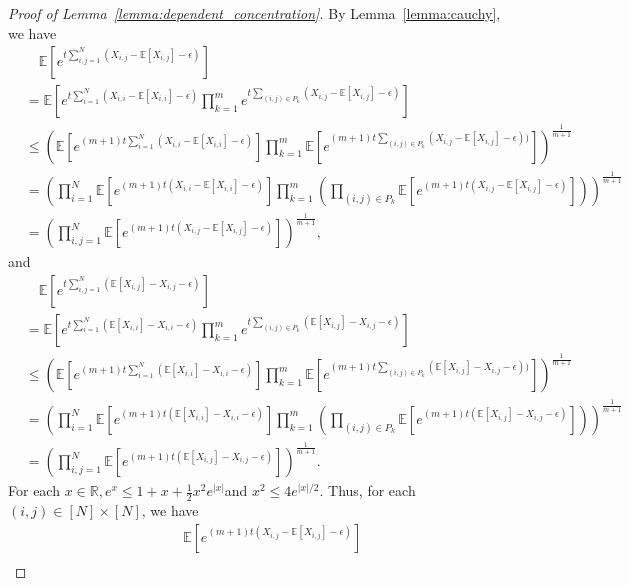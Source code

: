 \begin{proof}[Proof of Lemma~\ref{lemma:dependent_concentration}]
By Lemma~\ref{lemma:cauchy}, we have
\begin{align*}
    &\quad \mathbb{E} \left[ e^{t \sum_{i,j=1}^N (X_{i,j} - \mathbb{E}[X_{i,j}]-\epsilon)} \right] \\
    &= \mathbb{E}\left[e^{t \sum_{i=1}^N (X_{i,i} - \mathbb{E}[X_{i,i}]-\epsilon)}\prod_{k=1}^m e^{t \sum_{(i,j)\in P_k} (X_{i,j} - \mathbb{E}[X_{i,j}]-\epsilon)}  \right]\\
    &\leq \left( \mathbb{E}\left[e^{(m+1)t \sum_{i=1}^N (X_{i,i} - \mathbb{E}[X_{i,i}]-\epsilon)} \right] \prod_{k=1}^m \mathbb{E} \left[e^{(m+1)t \sum_{(i,j)\in P_k} (X_{i,j} - \mathbb{E}[X_{i,j}]-\epsilon))}  \right]\right)^{\frac{1}{m+1}}\\
    &= \left( \prod_{i=1}^N \mathbb{E}\left[e^{(m+1)t(X_{i,i} - \mathbb{E}[X_{i,i}]-\epsilon)} \right] \prod_{k=1}^m \left( \prod_{(i,j) \in P_k} \mathbb{E} \left[e^{(m+1)t (X_{i,j} - \mathbb{E}[X_{i,j}]-\epsilon)}  \right]\right)\right)^{\frac{1}{m+1}}\\
    &= \left(\prod_{i,j=1}^N \mathbb{E}\left[e^{(m+1)t (X_{i,j} - \mathbb{E}[X_{i,j}]-\epsilon)} \right]\right)^{\frac{1}{m+1}},
\end{align*}
and 
\begin{align*}
    &\quad \mathbb{E} \left[ e^{t \sum_{i,j=1}^N ( \mathbb{E}[X_{i,j}]-X_{i,j}-\epsilon)} \right] \\
    &= \mathbb{E}\left[e^{t \sum_{i=1}^N ( \mathbb{E}[X_{i,i}]-X_{i,i}-\epsilon)}\prod_{k=1}^m e^{t \sum_{(i,j)\in P_k} ( \mathbb{E}[X_{i,j}]-X_{i,j}-\epsilon)}  \right]\\
    &\leq \left( \mathbb{E}\left[e^{(m+1)t \sum_{i=1}^N ( \mathbb{E}[X_{i,i}]-X_{i,i}-\epsilon)} \right] \prod_{k=1}^m \mathbb{E} \left[e^{(m+1)t \sum_{(i,j)\in P_k} ( \mathbb{E}[X_{i,j}]-X_{i,j}-\epsilon))}  \right]\right)^{\frac{1}{m+1}}\\
    &= \left( \prod_{i=1}^N \mathbb{E}\left[e^{(m+1)t( \mathbb{E}[X_{i,i}]-X_{i,i}-\epsilon)} \right] \prod_{k=1}^m \left( \prod_{(i,j) \in P_k} \mathbb{E} \left[e^{(m+1)t ( \mathbb{E}[X_{i,j}]-X_{i,j}-\epsilon)}  \right]\right)\right)^{\frac{1}{m+1}}\\
    &= \left(\prod_{i,j=1}^N \mathbb{E}\left[e^{(m+1)t ( \mathbb{E}[X_{i,j}]-X_{i,j}-\epsilon)} \right]\right)^{\frac{1}{m+1}}.
\end{align*}
For each $x \in \mathbb{R}, e^x \leq 1+x+\frac{1}{2}x^2 e^{|x|}$and $x^2 \leq 4 e^{|x|/2}$. Thus, for each $(i,j) \in [N] \times [N]$, we have
\begin{align*}
    &\quad \mathbb{E}\left[e^{(m+1)t (X_{i,j} - \mathbb{E}[X_{i,j}]-\epsilon)} \right]\\

\end{align*}
\end{proof}
